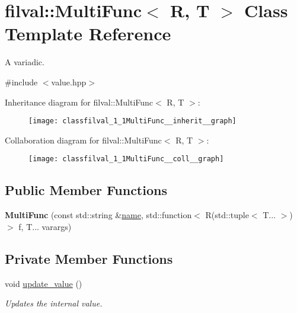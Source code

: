 \hypertarget{classfilval_1_1MultiFunc}{}\section{filval\+:\+:Multi\+Func$<$ R, T $>$ Class Template Reference}
\label{classfilval_1_1MultiFunc}


A variadic.  




{\ttfamily \#include $<$value.\+hpp$>$}



Inheritance diagram for filval\+:\+:Multi\+Func$<$ R, T $>$\+:
\nopagebreak
\begin{figure}[H]
\begin{center}
\leavevmode
\texttt{[image: classfilval\_1\_1MultiFunc\_\_inherit\_\_graph]}
\end{center}
\end{figure}


Collaboration diagram for filval\+:\+:Multi\+Func$<$ R, T $>$\+:
\nopagebreak
\begin{figure}[H]
\begin{center}
\leavevmode
\texttt{[image: classfilval\_1\_1MultiFunc\_\_coll\_\_graph]}
\end{center}
\end{figure}
\subsection*{Public Member Functions}
\begin{DoxyCompactItemize}
\item 
\hypertarget{classfilval_1_1MultiFunc_a80d86ee4951d3e2bebbdcdcb87b0259e}{}\label{classfilval_1_1MultiFunc_a80d86ee4951d3e2bebbdcdcb87b0259e} 
{\bfseries Multi\+Func} (const std\+::string \&\hyperlink{classfilval_1_1GenValue_a007e38c03ee041c2a657afa3d6e91ab1}{name}, std\+::function$<$ R(std\+::tuple$<$ T... $>$)$>$ f, T... varargs)
\end{DoxyCompactItemize}
\subsection*{Private Member Functions}
\begin{DoxyCompactItemize}
\item 
void \hyperlink{classfilval_1_1MultiFunc_ad8552619e8a9d32401fb7ec84532648b}{update\+\_\+value} ()
\begin{DoxyCompactList}\small\item\em Updates the internal value. \end{DoxyCompactList}\end{DoxyCompactItemize}
